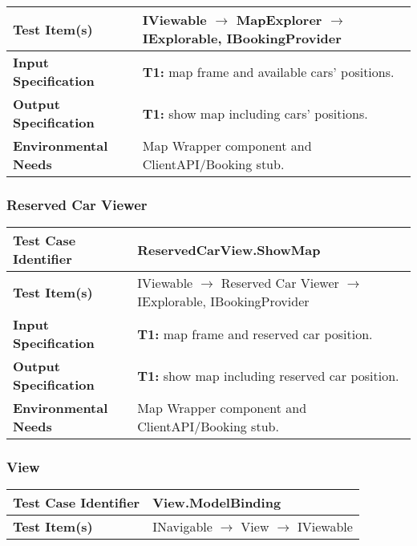 {\begin{tabularx}{\textwidth}{l X}
    \textbf{Test Item(s)} & IViewable $\rightarrow$ MapExplorer $\rightarrow$ IExplorable, IBookingProvider\\
    \hline 
    
    \textbf{Input Specification} & \textbf{T1:} map frame and available cars' positions.\\
    \hline 
    
    \textbf{Output Specification} & \textbf{T1:} show map including cars' positions.\\
    \hline 
    
    \textbf{Environmental Needs} & Map Wrapper component and ClientAPI/Booking stub.\\
    \hline
\end{tabularx}

\subsubsection{Reserved Car Viewer}
\noindent
\begin{tabularx}{\textwidth}{l X}
    \hline 
    \textbf{Test Case Identifier} & ReservedCarView.ShowMap\\ 
    \hline 
    
    \textbf{Test Item(s)} &  IViewable $\rightarrow$ Reserved Car Viewer $\rightarrow$ IExplorable, IBookingProvider\\
    \hline 
    
    \textbf{Input Specification} & \textbf{T1:} map frame and reserved car position.\\
    \hline 
    
    \textbf{Output Specification} & \textbf{T1:} show map including reserved car position.\\
    \hline 
    
    \textbf{Environmental Needs} & Map Wrapper component and ClientAPI/Booking stub.\\
    \hline
\end{tabularx}


\subsubsection{View}
\noindent
\begin{tabularx}{\textwidth}{l X}
    \hline 
    \textbf{Test Case Identifier} & View.ModelBinding\\ 
    \hline 
    
    \textbf{Test Item(s)} & INavigable $\rightarrow$ View $\rightarrow$ IViewable\\
    \hline 
    

\end{tabularx}}
